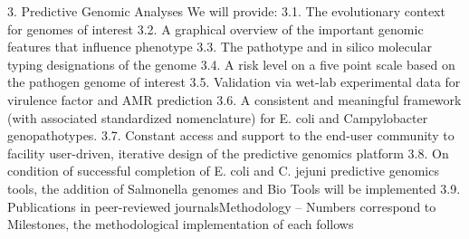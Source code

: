 \documentclass{bmcart}
\begin{document}
3. Predictive Genomic Analyses
We will provide:
3.1. The evolutionary context for genomes of interest
3.2. A graphical overview of the important genomic features that influence phenotype
3.3. The pathotype and in silico molecular typing designations of the genome
3.4. A risk level on a five point scale based on the pathogen genome of interest
3.5. Validation via wet-lab experimental data for virulence factor and AMR prediction
3.6. A consistent and meaningful framework (with associated standardized nomenclature) for E.
coli and Campylobacter genopathotypes.
3.7. Constant access and support to the end-user community to facility user-driven, iterative design
of the predictive genomics platform
3.8. On condition of successful completion of E. coli and C. jejuni predictive genomics tools, the
addition of Salmonella genomes and Bio Tools will be implemented
3.9. Publications in peer-reviewed journalsMethodology – Numbers correspond to Milestones, the methodological implementation of each
follows
\end{document}
